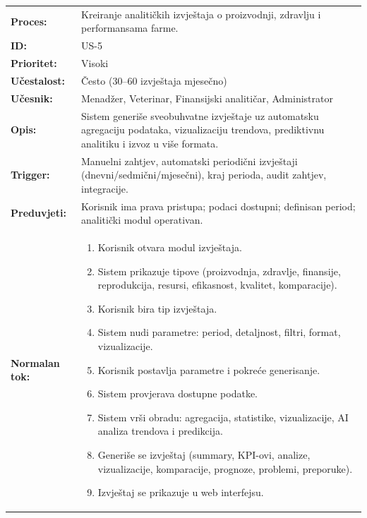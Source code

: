 \documentclass{article}
\begin{document}
\begin{table}[H]
\centering
\small
\begin{tabular}{|>{\raggedright}p{3.5cm}|>{\raggedright\arraybackslash}p{11cm}|}
\hline
\rowcolor[HTML]{B4C7E7}
\multicolumn{2}{|c|}{\textbf{US-5: Generisanje izvještaja}} \\
\hline
\textbf{Proces:} & Kreiranje analitičkih izvještaja o proizvodnji, zdravlju i performansama farme. \\
\hline
\textbf{ID:} & US-5 \\
\hline
\textbf{Prioritet:} & Visoki \\
\hline
\textbf{Učestalost:} & Često (30–60 izvještaja mjesečno) \\
\hline
\textbf{Učesnik:} & Menadžer, Veterinar, Finansijski analitičar, Administrator \\
\hline
\textbf{Opis:} & Sistem generiše sveobuhvatne izvještaje uz automatsku agregaciju podataka, vizualizaciju trendova, prediktivnu analitiku i izvoz u više formata. \\
\hline
\textbf{Trigger:} & Manuelni zahtjev, automatski periodični izvještaji (dnevni/sedmični/mjesečni), kraj perioda, audit zahtjev, integracije. \\
\hline
\textbf{Preduvjeti:} & Korisnik ima prava pristupa; podaci dostupni; definisan period; analitički modul operativan. \\
\hline
\textbf{Normalan tok:} & 
\begin{enumerate}[leftmargin=*, nosep]
    \item Korisnik otvara modul izvještaja.
    \item Sistem prikazuje tipove (proizvodnja, zdravlje, finansije, reprodukcija, resursi, efikasnost, kvalitet, komparacije).
    \item Korisnik bira tip izvještaja.
    \item Sistem nudi parametre: period, detaljnost, filtri, format, vizualizacije.
    \item Korisnik postavlja parametre i pokreće generisanje.
    \item Sistem provjerava dostupne podatke.
    \item Sistem vrši obradu: agregacija, statistike, vizualizacije, AI analiza trendova i predikcija.
    \item Generiše se izvještaj (summary, KPI-ovi, analize, vizualizacije, komparacije, prognoze, problemi, preporuke).
    \item Izvještaj se prikazuje u web interfejsu.

\end{enumerate}
\end{tabular}
\end{table}
\end{document}
